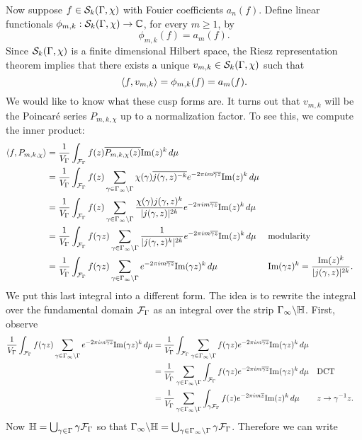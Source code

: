       Now suppose $f \in \mathcal{S}_{k}(\Gamma,\chi)$ with Fouier coefficients $a_{n}(f)$. Define linear functionals $\phi_{m,k}:\mathcal{S}_{k}(\Gamma,\chi) \to \mathbb{C}$, for every $m \ge 1$, by
      \[
        \phi_{m,k}(f) = a_{m}(f).
      \]
      Since $\mathcal{S}_{k}(\Gamma,\chi)$ is a finite dimensional Hilbert space, the Riesz representation theorem implies that there exists a unique $v_{m,k} \in \mathcal{S}_{k}(\Gamma,\chi)$ such that
      \[
        \langle f,v_{m,k}\rangle = \phi_{m,k}(f) = a_{m}(f).
      \]
      We would like to know what these cusp forms are. It turns out that $v_{m,k}$ will be the Poincar\'e series $P_{m,k,\chi}$ up to a normalization factor. To see this, we compute the inner product:
      \begin{align*}
        \langle f,P_{m,k,\chi}\rangle &= \frac{1}{V_{\Gamma}}\int_{\mathcal{F}_{\Gamma}}f(z)\overline{P_{m,k,\chi}(z)}\mathrm{Im}(z)^{k}\,d\mu \\
        &= \frac{1}{V_{\Gamma}}\int_{\mathcal{F}_{\Gamma}}f(z)\sum_{\gamma \in \Gamma_{\infty}\backslash\Gamma}\chi(\gamma)\overline{j(\gamma,z)^{-k}}e^{-2\pi im\overline{\gamma z}}\mathrm{Im}(z)^{k}\,d\mu \\
        &= \frac{1}{V_{\Gamma}}\int_{\mathcal{F}_{\Gamma}}f(z)\sum_{\gamma \in \Gamma_{\infty}\backslash\Gamma}\frac{\chi(\gamma)j(\gamma,z)^{k}}{|j(\gamma,z)|^{2k}}e^{-2\pi im\overline{\gamma z}}\mathrm{Im}(z)^{k}\,d\mu \\
        &= \frac{1}{V_{\Gamma}}\int_{\mathcal{F}_{\Gamma}}f(\gamma z)\sum_{\gamma \in \Gamma_{\infty}\backslash\Gamma}\frac{1}{|j(\gamma,z)^{k}|^{2k}}e^{-2\pi im\overline{\gamma z}}\mathrm{Im}(z)^{k}\,d\mu && \text{modularity} \\
        &= \frac{1}{V_{\Gamma}}\int_{\mathcal{F}_{\Gamma}}f(\gamma z)\sum_{\gamma \in \Gamma_{\infty}\backslash\Gamma}e^{-2\pi im\overline{\gamma z}}\mathrm{Im}(\gamma z)^{k}\,d\mu && \text{$\mathrm{Im}(\gamma z)^{k} = \frac{\mathrm{Im}(z)^{k}}{|j(\gamma,z)|^{2k}}$.}
      \end{align*}
      We put this last integral into a different form. The idea is to rewrite the integral over the fundamental domain $\mathcal{F}_{\Gamma}$ as an integral over the strip $\Gamma_{\infty}\backslash\mathbb{H}$. First, observe
      \begin{align*}
        \frac{1}{V_{\Gamma}}\int_{\mathcal{F}_{\Gamma}}f(\gamma z)\sum_{\gamma \in \Gamma_{\infty}\backslash\Gamma}e^{-2\pi im\overline{\gamma z}}\mathrm{Im}(\gamma z)^{k}\,d\mu &= \frac{1}{V_{\Gamma}}\int_{\mathcal{F}_{\Gamma}}\sum_{\gamma \in \Gamma_{\infty}\backslash\Gamma}f(\gamma z)e^{-2\pi im\overline{\gamma z}}\mathrm{Im}(\gamma z)^{k}\,d\mu \\
        &= \frac{1}{V_{\Gamma}}\sum_{\gamma \in \Gamma_{\infty}\backslash\Gamma}\int_{\mathcal{F}_{\Gamma}}f(\gamma z)e^{-2\pi im\overline{\gamma z}}\mathrm{Im}(\gamma z)^{k}\,d\mu && \text{DCT} \\
        &= \frac{1}{V_{\Gamma}}\sum_{\gamma \in \Gamma_{\infty}\backslash\Gamma}\int_{\gamma\mathcal{F}_{\Gamma}}f(z)e^{-2\pi im\overline{z}}\mathrm{Im}(z)^{k}\,d\mu && \text{$z \to \gamma^{-1}z$.}
      \end{align*}
      Now $\mathbb{H} = \bigcup_{\gamma \in \Gamma}\gamma\mathcal{F}_{\Gamma}$ so that $\Gamma_{\infty}\backslash\mathbb{H} = \bigcup_{\gamma \in \Gamma_{\infty}\backslash\Gamma}\gamma\mathcal{F}_{\Gamma}$. Therefore we can write
